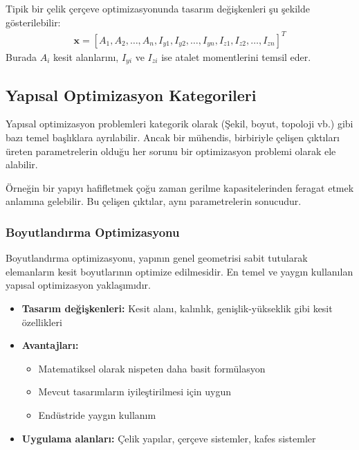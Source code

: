\begin{tcolorbox}[title=Tasarım Değişkenleri Gösterimi]
Tipik bir çelik çerçeve optimizasyonunda tasarım değişkenleri şu şekilde gösterilebilir:
\begin{align}
\mathbf{x} = [A_1, A_2, \ldots, A_n, I_{y1}, I_{y2}, \ldots, I_{yn}, I_{z1}, I_{z2}, \ldots, I_{zn}]^T
\end{align}
Burada $A_i$ kesit alanlarını, $I_{yi}$ ve $I_{zi}$ ise atalet momentlerini temsil eder.
\end{tcolorbox}

\subsection{Yapısal Optimizasyon Kategorileri}

Yapısal optimizasyon problemleri kategorik olarak (Şekil, boyut, topoloji vb.) gibi bazı temel başlıklara ayrılabilir. Ancak bir mühendis, birbiriyle çelişen çıktıları üreten parametrelerin olduğu her sorunu bir optimizasyon problemi olarak ele alabilir. 

Örneğin bir yapıyı hafifletmek çoğu zaman gerilme kapasitelerinden feragat etmek anlamına gelebilir. Bu çelişen çıktılar, aynı parametrelerin sonucudur.

\subsubsection{Boyutlandırma Optimizasyonu}
Boyutlandırma optimizasyonu, yapının genel geometrisi sabit tutularak elemanların kesit boyutlarının optimize edilmesidir. En temel ve yaygın kullanılan yapısal optimizasyon yaklaşımıdır.

\begin{itemize}
    \item \textbf{Tasarım değişkenleri:} Kesit alanı, kalınlık, genişlik-yükseklik gibi kesit özellikleri
    \item \textbf{Avantajları:} 
    \begin{itemize}
        \item Matematiksel olarak nispeten daha basit formülasyon
        \item Mevcut tasarımların iyileştirilmesi için uygun
        \item Endüstride yaygın kullanım
    \end{itemize}
    \item \textbf{Uygulama alanları:} Çelik yapılar, çerçeve sistemler, kafes sistemler
\end{itemize}


